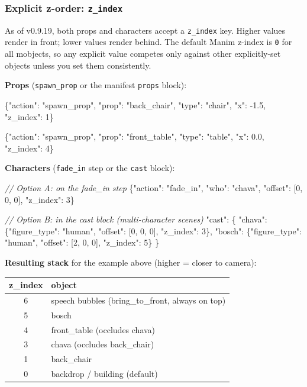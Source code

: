 \documentclass[
  11pt,
]{book}
\newenvironment{Shaded}{}{}
\newcommand{\CommentTok}[1]{\textcolor[rgb]{0.38,0.63,0.69}{\textit{#1}}}
\newcommand{\NormalTok}[1]{#1}
\begin{document}
\subsubsection{Explicit z-order: \texttt{z\_index}}\label{explicit-z-order}

As of v0.9.19, both props and characters accept a \texttt{z\_index} key.
Higher values render in front; lower values render behind. The default
Manim z-index is \texttt{0} for all mobjects, so any explicit value
competes only against other explicitly-set objects unless you set them
consistently.

\textbf{Props} (\texttt{spawn\_prop} or the manifest \texttt{props}
block):

\begin{Shaded}
\begin{Highlighting}[]
\NormalTok{\{"action": "spawn\_prop", "prop": "back\_chair", "type": "chair",}
\NormalTok{ "x": -1.5, "z\_index": 1\}}

\NormalTok{\{"action": "spawn\_prop", "prop": "front\_table", "type": "table",}
\NormalTok{ "x": 0.0, "z\_index": 4\}}
\end{Highlighting}
\end{Shaded}

\textbf{Characters} (\texttt{fade\_in} step or the \texttt{cast} block):

\begin{Shaded}
\begin{Highlighting}[]
\CommentTok{// Option A: on the fade\_in step}
\NormalTok{\{"action": "fade\_in", "who": "chava", "offset": [0, 0, 0], "z\_index": 3\}}

\CommentTok{// Option B: in the cast block (multi-character scenes)}
\NormalTok{"cast": \{}
\NormalTok{  "chava": \{"figure\_type": "human", "offset": [0, 0, 0], "z\_index": 3\},}
\NormalTok{  "bosch": \{"figure\_type": "human", "offset": [2, 0, 0], "z\_index": 5\}}
\NormalTok{\}}
\end{Highlighting}
\end{Shaded}

\textbf{Resulting stack} for the example above (higher = closer to
camera):

\begin{center}
\begin{tabular}{cl}
\textbf{z\_index} & \textbf{object} \\
\hline
6 & speech bubbles (bring\_to\_front, always on top) \\
5 & bosch \\
4 & front\_table (occludes chava) \\
3 & chava (occludes back\_chair) \\
1 & back\_chair \\
0 & backdrop / building (default) \\
\end{tabular}
\end{center}
\end{document}
